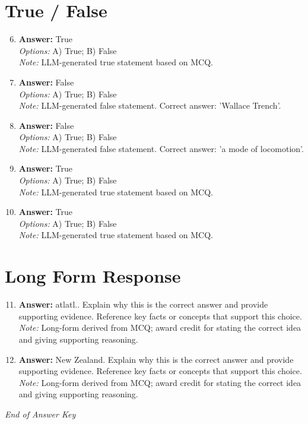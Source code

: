 \documentclass[12pt]{article}
\begin{document}
\section*{True / False}
\begin{enumerate}[label=\arabic*.]
\setcounter{enumi}{5}
\item \textbf{Answer:} True
\\ \textit{Options:} A) True; B) False
\\ \textit{Note:} LLM-generated true statement based on MCQ.
\item \textbf{Answer:} False
\\ \textit{Options:} A) True; B) False
\\ \textit{Note:} LLM-generated false statement. Correct answer: 'Wallace Trench'.
\item \textbf{Answer:} False
\\ \textit{Options:} A) True; B) False
\\ \textit{Note:} LLM-generated false statement. Correct answer: 'a mode of locomotion'.
\item \textbf{Answer:} True
\\ \textit{Options:} A) True; B) False
\\ \textit{Note:} LLM-generated true statement based on MCQ.
\item \textbf{Answer:} True
\\ \textit{Options:} A) True; B) False
\\ \textit{Note:} LLM-generated true statement based on MCQ.
\end{enumerate}

\section*{Long Form Response}
\begin{enumerate}[label=\arabic*.]
\setcounter{enumi}{10}
\item \textbf{Answer:} atlatl.. Explain why this is the correct answer and provide supporting evidence. Reference key facts or concepts that support this choice.
\\ \textit{Note:} Long-form derived from MCQ; award credit for stating the correct idea and giving supporting reasoning.
\item \textbf{Answer:} New Zealand. Explain why this is the correct answer and provide supporting evidence. Reference key facts or concepts that support this choice.
\\ \textit{Note:} Long-form derived from MCQ; award credit for stating the correct idea and giving supporting reasoning.
\end{enumerate}

\vfill
\noindent\textit{End of Answer Key}
\end{document}
